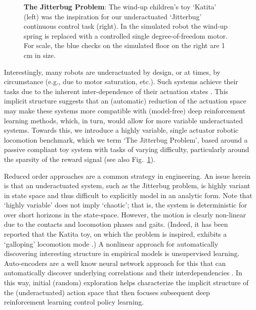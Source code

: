 \documentclass{article}
\begin{document}
\begin{figure}[t]
    \setlength{\belowcaptionskip}{-10pt}
    \caption{
        \textbf{The Jitterbug Problem}: The wind-up children's toy `Katita' (left) was the inspiration for our underactuated `Jitterbug' continuous control task (right).
        In the simulated robot the wind-up spring is replaced with a controlled single degree-of-freedom motor.
        For scale, the blue checks on the simulated floor on the right are 1 cm in size.
    }
    \vspace*{-6pt}
    \label{fig:leader}
    
\end{figure} 

Interestingly, many robots are underactuated by design, or at times, by circumstance (e.g., due to motor saturation, etc.).
Such systems achieve their tasks due to the inherent inter-dependence of their actuation states \cite{spong1998underactuated}.
This implicit structure suggests that an (automatic) reduction of the actuation space may make these systems more compatible with (model-free) deep reinforcement learning methods, which, in turn, would allow for more variable underactuated systems.
Towards this, we introduce a highly variable, single actuator robotic locomotion benchmark, which we term `The Jitterbug Problem', based around a passive compliant toy system with tasks of varying difficulty, particularly around the sparsity of the reward signal (see also Fig.~\ref{fig:leader}).

Reduced order approaches are a common strategy in engineering.
An issue herein is that an underactuated system, such as the Jitterbug problem, is highly variant in state space and thus difficult to explicitly model in an analytic form.
Note that `highly variable' does not imply `chaotic'; that is, the system is deterministic for over short horizons in the state-space.
However, the motion is clearly non-linear due to the contacts and locomotion phases and gaits.  (Indeed, it has been reported that the Katita toy, on which the problem is inspired, exhibits a `galloping' locomotion mode \cite{jgn.thesis}.)
A nonlinear approach for automatically discovering interesting structure in empirical models is unsupervised learning.
Auto-encoders are a well know neural network approach for this that can automatically discover underlying correlations and their interdependencies \cite{AE_hinton2006reducing}.
In this way, initial (random) exploration helps characterize the implicit structure of the (underactuated) action space that then focuses subsequent deep reinforcement learning control policy learning.
\end{document}
